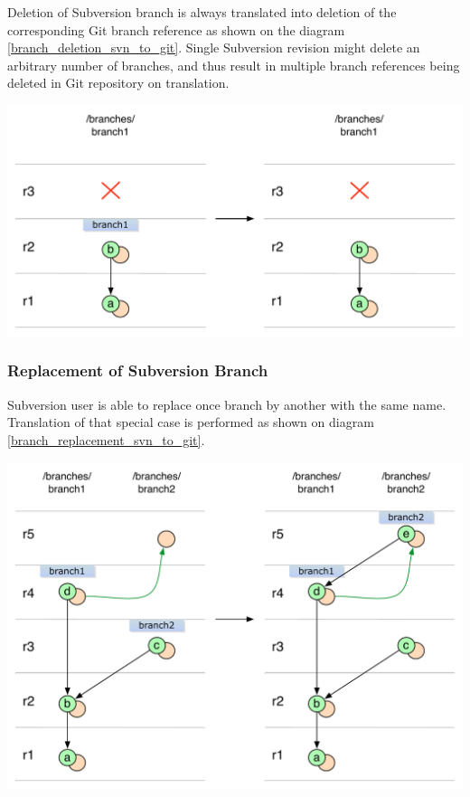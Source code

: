 Deletion of Subversion branch is always translated into deletion of the corresponding Git branch reference
as shown on the diagram \ref{branch_deletion_svn_to_git}. Single Subversion revision might delete an arbitrary number of branches, 
and thus result in multiple branch references being deleted in Git repository on translation.
\begin{center}
\includegraphics[width=\textwidth]{img/diagrams/branch_deletion_svn_to_git.pdf}%
\label{branch_deletion_svn_to_git}%
\end{center}

\subsubsection{Replacement of Subversion Branch}

Subversion user is able to replace once branch by another with the same name. %
Translation of that special case is performed as shown on diagram \ref{branch_replacement_svn_to_git}.
\begin{center}
\includegraphics[width=\textwidth]{img/diagrams/branch_replacement_svn_to_git.pdf}%
\label{branch_replacement_svn_to_git}%
\end{center}

